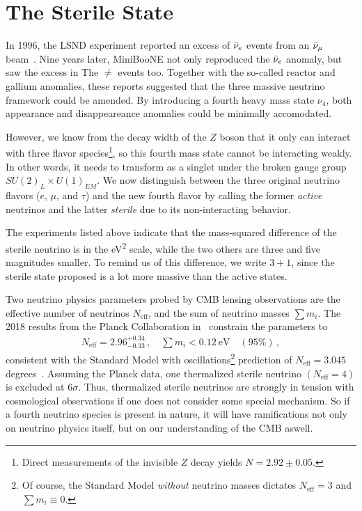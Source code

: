 %
%
\section{The Sterile State}\label{sec:anomalies}
In 1996, the LSND experiment reported an excess of $\bar{\nu}_e$ events from an $\bar{\nu}_\mu$ beam~\cite{lsnd}.  
Nine years later, MiniBooNE not only reproduced the $\bar{\nu}_e$ anomaly, but saw the excess in The
$\ne$ events too. Together with the so-called reactor and gallium anomalies, these reports suggested 
that the three massive neutrino framework could be amended.
By introducing a fourth heavy mass state $\nu_4$, both appearance and disappeareance anomalies could be minimally accomodated.

However, we know from the decay width of the $Z$ boson that it only can interact with three flavor species\footnote{
    Direct measurements of the invisible $Z$ decay yields $N=2.92 \pm 0.05$\cite{pdg}.
}, 
so this fourth mass state cannot be interacting weakly. In other words, it needs to transform as a
singlet under the broken gauge group $SU(2)_L \times U(1)_{EM}$.
We now distinguish between the three original neutrino flavors ($e$, $\mu$, and $\tau$) and the new fourth 
flavor by calling the former \emph{active} neutrinos
and the latter \emph{sterile} due to its non-interacting behavior.

The experiments listed above indicate that the mass-squared difference of the 
sterile neutrino is in the \si{\eV\squared} scale, while the two others
are three and five magnitudes smaller. To remind us of this difference, we write $3+1$, since the sterile state 
proposed is a lot more massive than the active states.


Two neutrino physics parameters probed by CMB lensing observations are the effective number of neutrinos
$N_\text{eff}$, and the sum of neutrino masses $\sum m_i$. 
The 2018 results from the Planck Collaboration in~\cite{planck2018} constrain the parameters to 
\begin{align}
    N_\text{eff} = 2.96^{+0.34}_{-0.33}\,, \quad \sum m_i < \SI{0.12}{\eV} \quad (95\%)\,,
\end{align}
consistent with the Standard Model with oscillations\footnote{Of course, the 
Standard Model \emph{without} neutrino masses dictates $N_\text{eff} = 3$ and $\sum m_i \equiv 0$.} prediction of $N_\text{eff} = 3.045$ degrees~\cite{desalas2016}.
Assuming the Planck data, one thermalized sterile neutrino $(N_\text{eff} = 4)$ is excluded at $6\sigma$. 
Thus, thermalized sterile 
neutrinos are strongly in tension with cosmological observations if one does not consider some special mechanism.
So if a fourth neutrino species is present in nature, it will have ramifications not only on neutrino physics itself, but on
our understanding of the CMB aswell.


